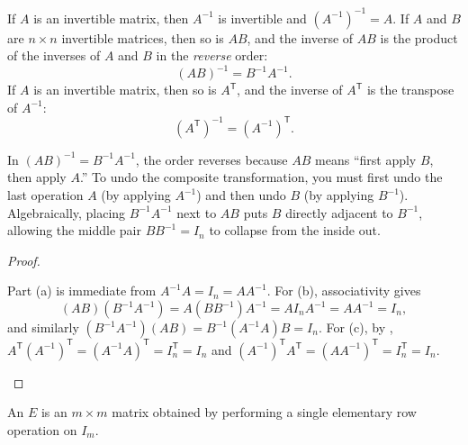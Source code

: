 \documentclass[10pt]{scrartcl}
\begin{document}
\begin{theorem*}
  \begin{enumerate}[(a)]
    \ii If $A$ is an invertible matrix, then $A^{-1}$ is invertible and $(A^{-1})^{-1} = A$.
    \ii If $A$ and $B$ are $n\times n$ invertible matrices, then so is $AB$, and the inverse of $AB$ is the product of the inverses of $A$ and $B$ in the \emph{reverse} order:
    \[
      (AB)^{-1} = B^{-1}A^{-1}.
    \]
    \ii If $A$ is an invertible matrix, then so is $A^{\mathsf T}$, and the inverse of $A^{\mathsf T}$ is the transpose of $A^{-1}$:
    \[
      (A^{\mathsf T})^{-1} = (A^{-1})^{\mathsf T}.
    \]
  \end{enumerate}
\end{theorem*}
\begin{ideabox}
  In $(AB)^{-1}=B^{-1}A^{-1}$, the order reverses because $AB$ means ``first apply $B$, then apply $A$.'' To undo the composite transformation, you must first undo the last operation $A$ (by applying $A^{-1}$) and then undo $B$ (by applying $B^{-1}$). Algebraically, placing $B^{-1}A^{-1}$ next to $AB$ puts $B$ directly adjacent to $B^{-1}$, allowing the middle pair $BB^{-1}=I_n$ to collapse from the inside out.
\end{ideabox}
\begin{proof}
  \begin{steps}
    \ii Part (a) is immediate from $A^{-1}A=I_n=AA^{-1}$.
    \ii For (b), associativity gives
    \[
      (AB)(B^{-1}A^{-1})=A(BB^{-1})A^{-1}=AI_nA^{-1}=AA^{-1}=I_n,
    \]
    and similarly $(B^{-1}A^{-1})(AB)=B^{-1}(A^{-1}A)B=I_n$.
    \ii For (c), by , $A^{\mathsf T}(A^{-1})^{\mathsf T}=(A^{-1}A)^{\mathsf T}=I_n^{\mathsf T}=I_n$ and $(A^{-1})^{\mathsf T}A^{\mathsf T}=(AA^{-1})^{\mathsf T}=I_n^{\mathsf T}=I_n$.
  \end{steps}
\end{proof}

\begin{definition*}
  An  $E$ is an $m\times m$ matrix obtained by performing a single elementary row operation on $I_m$.
\end{definition*}
\end{document}
